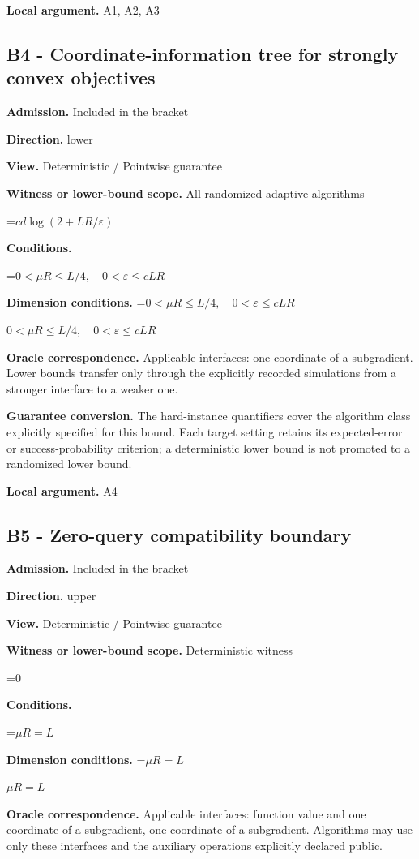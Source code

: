 \documentclass[10pt,a4paper]{article}
\newcommand{\AtlasMath}[1]{\par\begingroup\centering\setbox0=\hbox{$\displaystyle #1$}\ifdim\wd0>1.4\linewidth\typeout{ATLAS WIDE FORMULA: \the\wd0}\fi\ifdim\wd0>\linewidth\resizebox{\linewidth}{!}{\box0}\else\box0\fi\par\endgroup}
\newcommand{\AtlasInlineMath}[1]{\begingroup\setbox0=\hbox{$#1$}\ifdim\wd0>.4\linewidth\endgroup\AtlasMath{#1}\else\endgroup$#1$\fi}
\begin{document}
\textbf{Local argument.} A1, A2, A3

\subsection{B4 - Coordinate-information tree for strongly convex objectives}
\textbf{Admission.} Included in the bracket

\textbf{Direction.} lower

\textbf{View.} Deterministic / Pointwise guarantee

\textbf{Witness or lower-bound scope.} All randomized adaptive algorithms

\AtlasMath{cd\log(2+LR/\varepsilon)}
\textbf{Conditions.} 
\AtlasMath{0<\mu R\le L/4,\quad0<\varepsilon\le cLR}


\textbf{Dimension conditions.} \AtlasInlineMath{0<\mu R\le L/4,\quad0<\varepsilon\le cLR}

\textbf{Oracle correspondence.} Applicable interfaces: one coordinate of a subgradient. Lower bounds transfer only through the explicitly recorded simulations from a stronger interface to a weaker one.

\textbf{Guarantee conversion.} The hard-instance quantifiers cover the algorithm class explicitly specified for this bound. Each target setting retains its expected-error or success-probability criterion; a deterministic lower bound is not promoted to a randomized lower bound.

\textbf{Local argument.} A4

\subsection{B5 - Zero-query compatibility boundary}
\textbf{Admission.} Included in the bracket

\textbf{Direction.} upper

\textbf{View.} Deterministic / Pointwise guarantee

\textbf{Witness or lower-bound scope.} Deterministic witness

\AtlasMath{0}
\textbf{Conditions.} 
\AtlasMath{\mu R=L}


\textbf{Dimension conditions.} \AtlasInlineMath{\mu R=L}

\textbf{Oracle correspondence.} Applicable interfaces: function value and one coordinate of a subgradient, one coordinate of a subgradient. Algorithms may use only these interfaces and the auxiliary operations explicitly declared public.
\end{document}
